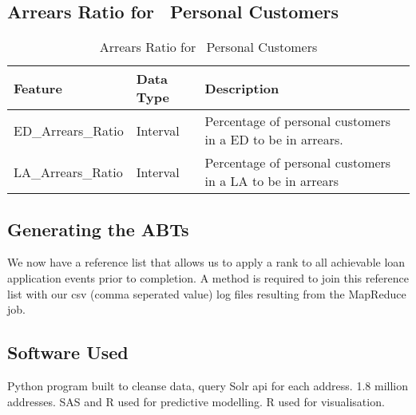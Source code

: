 \subsection{Arrears Ratio for \subjectname\ Personal Customers}
\begin{table}[H]
	\centering
	\label{my-label}
	\begin{tabular}{|l|l|p{8cm}|}
		\hline
		\textbf{Feature} & \textbf{Data Type} & \textbf{Description}                                                                                                                                                                                                                                                                                                                                                                                                                                                                                                                              \\ \hline
		ED\_Arrears\_Ratio          & Interval        & Percentage of personal customers in a ED to be in arrears.                                                                                                                                                                                                                                                                                                                                                                           \\ 
		LA\_Arrears\_Ratio           & Interval        & Percentage of personal customers in a LA to be in arrears \\ \hline
	\end{tabular}
	\caption{Arrears Ratio for \subjectname\ Personal Customers }
\end{table}



\subsection{Generating the ABTs}
We now have a reference list that allows us to apply a rank to all achievable loan application events prior to completion. A method is required to join this reference list with our csv (comma seperated value) log files resulting from the MapReduce job. 

\subsection{Software Used}\label{softwareUsed}
Python program built to cleanse data, query Solr api for each address. 1.8 million addresses.
SAS and R used for predictive modelling. R used for visualisation.


